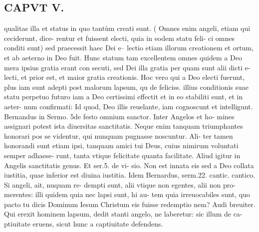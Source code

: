 \documentclass{article}
\begin{document}
\begin{pages}
\section*{CAPVT  V. }
\marginpar{[ p.335 ]}\pstart qualitas illa et status in quo tantùm creati sunt. ( Omnes enim angeli, etiam qui ceciderunt, dice- rentur et fuissent electi, quia in eodem statu feli- ci omnes conditi sunt) sed praecessit haec Dei e-- lectio etiam illorum creationem et ortum, et ab aeterno in Deo fuit. Hunc statum tam excellentem omnes quidem a Deo mera ipsius gratia erant con secuti, sed Dei illa gratia per quam sunt alii dicti e- lecti, et prior est, et maior gratia creationis. Hoc vero qui a Deo electi fuerunt, plus iam sunt adepti post malorum lapsum, qu de feliciss. illius conditionis suae statu perpetuo futuro iam a Deo certissimi effectit et in eo stabiliti sunt, et in aeter- num confirmati: Id quod, Deo illis reuelante, iam cognoscunt et intelligunt. Bernandus in Sermo. 5de festo omnium sanctor. Inter Angelos et ho- mines assignari potest ista diuersitas sanctitatis. Neque enim tanquam triumphantes honorari pos se videntur, qui nunquam pugnasse noscuntur. Ali- ter tamen honorandi sunt etiam ipsi, tanquam amici tui Deus, cuius nimirum voluntati semper adhaese- runt, tanta vtique felicitate quanta facilitate. Aliud igitur in Angelis sanctitatis genus. Et ser.5. de vi- sio. Non est innata eis sed a Deo collata iustitia, quae inferior est diuina iustitia. Idem Bernardus, serm.22. cantic. cantico. Si angeli, ait, nuquam re- dempti sunt, alii vtique non egentes, alii non pro- merentes: illi quidem quia nec lapsi sunt, hi au- tem quia irreuocabiles sunt, quo pacto tu dicis Dominum Iesum Christum eis fuisse redemptio nem? Audi breuiter. Qui erexit hominem lapsum, dedit stanti angelo, ne laberetur: sic illum de ca- ptiuitate eruens, sicut hunc a captiuitate defendens.  \pend

\end{pages}
\end{document}
